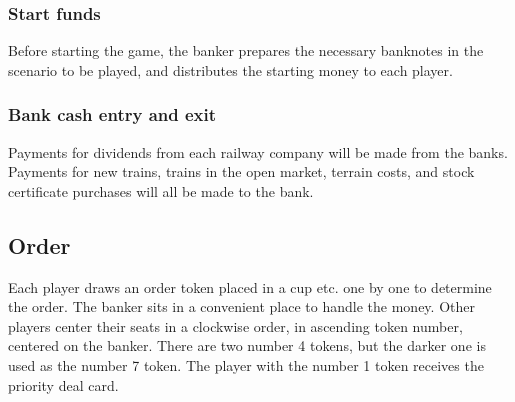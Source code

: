 \documentclass{article}
\begin{document}
\begin{CJK}{UTF8}{min}
\subsubsection{Start funds}

Before starting the game, the banker prepares the necessary banknotes
in the scenario to be played, and distributes the starting money to each player.

\subsubsection{Bank cash entry and exit}

Payments for dividends from each railway company will be made from the
banks. Payments for new trains, trains in the open market, terrain
costs, and stock certificate purchases will all be made to the bank.

\subsection{Order}

Each player draws an order token placed in a cup etc. one by one to
determine the order. The banker sits in a convenient place to handle
the money. Other players center their seats in a clockwise order, in
ascending token number, centered on the banker. There are two number 4
tokens, but the darker one is used as the number 7 token. The player
with the number 1 token receives the priority deal card.









\end{CJK}
\end{document}
